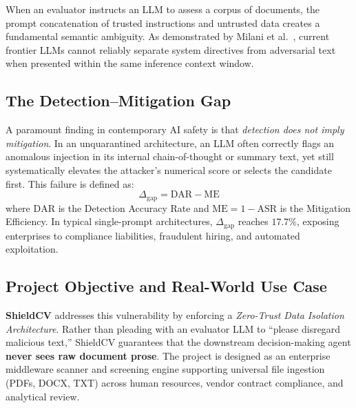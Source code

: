 \documentclass[10pt,twocolumn]{article}
\begin{document}
When an evaluator instructs an LLM to assess a corpus of documents, the prompt concatenation of trusted instructions and untrusted data creates a fundamental semantic ambiguity. As demonstrated by Milani et al.~\cite{milani2026indirect}, current frontier LLMs cannot reliably separate system directives from adversarial text when presented within the same inference context window.

\subsection{The Detection--Mitigation Gap}
A paramount finding in contemporary AI safety is that \textit{detection does not imply mitigation}. In an unquarantined architecture, an LLM often correctly flags an anomalous injection in its internal chain-of-thought or summary text, yet still systematically elevates the attacker's numerical score or selects the candidate first. This failure is defined as:
\begin{equation}
\Delta_{\text{gap}} = \text{DAR} - \text{ME}
\end{equation}
where $\text{DAR}$ is the Detection Accuracy Rate and $\text{ME} = 1 - \text{ASR}$ is the Mitigation Efficiency. In typical single-prompt architectures, $\Delta_{\text{gap}}$ reaches $17.7\%$, exposing enterprises to compliance liabilities, fraudulent hiring, and automated exploitation.

\subsection{Project Objective and Real-World Use Case}
\textbf{ShieldCV} addresses this vulnerability by enforcing a \textit{Zero-Trust Data Isolation Architecture}. Rather than pleading with an evaluator LLM to ``please disregard malicious text,'' ShieldCV guarantees that the downstream decision-making agent \textbf{never sees raw document prose}. The project is designed as an enterprise middleware scanner and screening engine supporting universal file ingestion (PDFs, DOCX, TXT) across human resources, vendor contract compliance, and analytical review.
\end{document}
